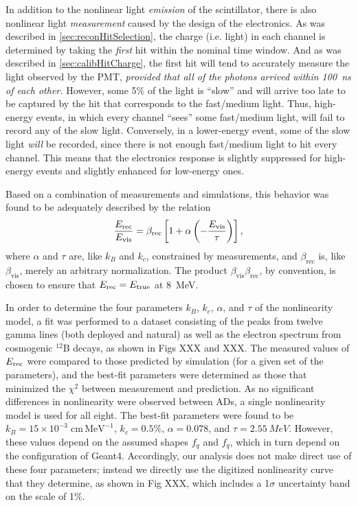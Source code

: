 \documentclass[../thesis.tex]{subfiles}
\begin{document}
In addition to the nonlinear light \emph{emission} of the scintillator, there is
also nonlinear light \emph{measurement} caused by the design of the
electronics. As was described in \autoref{sec:reconHitSelection}, the charge
(i.e. light) in each channel is determined by taking the \emph{first} hit within
the nominal time window. And as was described in \autoref{sec:calibHitCharge},
the first hit will tend to accurately measure the light observed by the PMT,
\emph{provided that all of the photons arrived within 100~ns of each other.}
However, some 5\% of the light is ``slow'' and will arrive too late to be
captured by the hit that corresponds to the fast/medium light. Thus, high-energy
events, in which every channel ``sees'' some fast/medium light, will fail to
record any of the slow light. Conversely, in a lower-energy event, some of the
slow light \emph{will} be recorded, since there is not enough fast/medium light
to hit every channel. This means that the electronics response is slightly
suppressed for high-energy events and slightly enhanced for low-energy ones.

Based on a combination of measurements and simulations, this behavior was found
to be adequately described by the relation
\begin{equation*}
  \frac{E_\mathrm{rec}}{E_\mathrm{vis}} = \beta_{\mathrm{rec}}\left[ 1 + \alpha \left( - \frac{E_\mathrm{vis}}{\tau} \right) \right],
\end{equation*}
where $\alpha$ and $\tau$ are, like $k_B$ and $k_c$, constrained by
measurements, and $\beta_{\mathrm{rec}}$ is, like $\beta_{\mathrm{vis}}$, merely
an arbitrary normalization. The product
$\beta_{\mathrm{vis}}\beta_{\mathrm{rec}}$, by convention, is chosen to ensure
that $E_\mathrm{rec} = E_\mathrm{true}$ at 8~MeV.

In order to determine the four parameters $k_B$, $k_c$, $\alpha$, and $\tau$ of
the nonlinearity model, a fit was performed to a dataset consisting of the peaks
from twelve gamma lines (both deployed and natural) as well as the electron
spectrum from cosmogenic $^{12}$B decays, as shown in Figs XXX and XXX. The
measured values of $E_\mathrm{rec}$ were compared to those predicted by simulation (for a
given set of the parameters), and the best-fit parameters were determined as
those that minimized the $\chi^2$ between measurement and prediction. As no
significant differences in nonlinearity were observed between ADs, a single
nonlinearity model is used for all eight. The best-fit parameters were found to
be $k_B = 15 \times 10^{-3}\;\mathrm{cm\, MeV^{-1}}$, $k_c = 0.5\%$, $\alpha =
0.078$, and $\tau = \SI{2.55}{MeV}$. However, these values depend on the assumed
shapes $f_q$ and $f_q$, which in turn depend on the configuration of
Geant4. Accordingly, our analysis does not make direct use of these four
parameters; instead we directly use the digitized nonlinearity curve that they
determine, as shown in Fig XXX, which includes a 1$\sigma$ uncertainty band on
the scale of 1\%.
\end{document}
